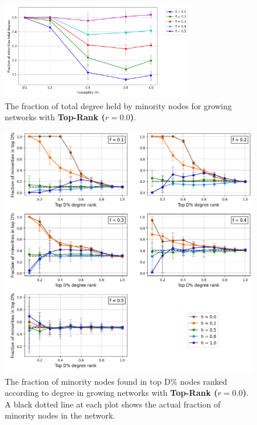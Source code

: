 \begin{appendices}
\begin{figure}
	\centering
	\includegraphics[trim=0 5 0 10, clip, width=0.75\textwidth]{images/mf_growth_top00.png}
	\caption{The fraction of total degree held by minority nodes for growing networks with \textbf{Top-Rank ($r = 0.0$)}.}
	\label{mf_growth_top00_fig}
\end{figure}

\begin{figure}[h!]
	\centering
	\includegraphics[trim=0 10 0 5, clip, width=1.0\textwidth]{images/top_growth_top00.png}
	\caption{The fraction of minority nodes found in top D\% nodes ranked according to degree in growing networks with \textbf{Top-Rank ($r = 0.0$)}. A black dotted line at each plot shows the actual fraction of minority nodes in the network.}
	\label{top_growth_top00_fig}
\end{figure}


\end{appendices}
